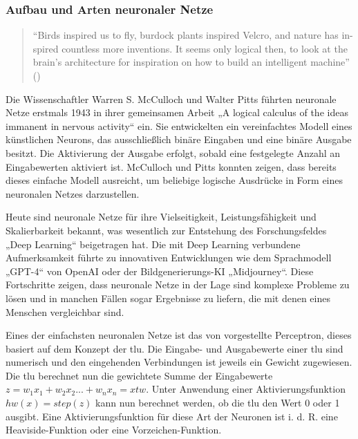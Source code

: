 \subsubsection{Aufbau und Arten neuronaler Netze}

\begin{quote}
  "`Birds inspired us to fly, burdock plants inspired Velcro, and nature has in- spired countless more inventions. It seems only logical then, to look at the brain’s architecture for inspiration on how to build an intelligent machine"' (\cite[S. 279]{Geron2019})
\end{quote}

Die Wissenschaftler Warren S. McCulloch und Walter Pitts führten neuronale Netze erstmals 1943 in ihrer gemeinsamen Arbeit „A logical calculus of the ideas immanent in nervous activity“ \cite{McCulloch1943} ein. Sie entwickelten ein vereinfachtes Modell eines künstlichen Neurons, das ausschließlich binäre Eingaben und eine binäre Ausgabe besitzt. Die Aktivierung der Ausgabe erfolgt, sobald eine festgelegte Anzahl an Eingabewerten aktiviert ist. McCulloch und Pitts konnten zeigen, dass bereits dieses einfache Modell ausreicht, um beliebige logische Ausdrücke in Form eines neuronalen Netzes darzustellen.

Heute sind neuronale Netze für ihre Vielseitigkeit, Leistungsfähigkeit und Skalierbarkeit bekannt, was wesentlich zur Entstehung des Forschungsfeldes „Deep Learning“ beigetragen hat. \cite{Geron2019} Die mit Deep Learning verbundene Aufmerksamkeit führte zu innovativen Entwicklungen wie dem Sprachmodell „GPT-4“ von OpenAI oder der Bildgenerierungs-KI „Midjourney“. Diese Fortschritte zeigen, dass neuronale Netze in der Lage sind komplexe Probleme zu lösen und in manchen Fällen sogar Ergebnisse zu liefern, die mit denen eines Menschen vergleichbar sind. \cite{OpenAI2024}

Eines der einfachsten neuronalen Netze ist das von \cite{Rosenblatt1958} vorgestellte Perceptron, dieses basiert auf dem Konzept der \ac{tlu}. Die Eingabe- und Ausgabewerte einer \ac{tlu} sind numerisch und den eingehenden Verbindungen ist jeweils ein Gewicht zugewiesen. Die \ac{tlu} berechnet nun die gewichtete Summe der Eingabewerte \(z=w_1x_1+w_2x_2 ... +w_nx_n=xtw\). Unter Anwendung einer Aktivierungsfunktion \(hw(x)=step(z)\) kann nun berechnet werden, ob die \ac{tlu} den Wert 0 oder 1 ausgibt. Eine Aktivierungsfunktion für diese Art der Neuronen ist i. d. R. eine Heaviside-Funktion oder eine Vorzeichen-Funktion. \cite[vgl. S. 284 ff.]{Geron2019}

